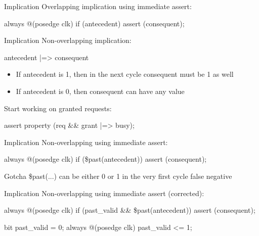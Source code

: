 \documentclass{beamer}
\begin{document}
\begin{frame}[fragile]{Implication}
Overlapping implication using immediate assert:

\begin{semiverbatim}
always @(posedge clk)
  if (antecedent)
    assert (consequent);
\end{semiverbatim}
\end{frame}


\begin{frame}{Implication}
Non-overlapping implication:

\begin{semiverbatim}
antecedent |=> consequent
\end{semiverbatim}

\begin{itemize}
 \item If antecedent is 1, then in the next cycle consequent must be 1 as well
 \item If antecedent is 0, then consequent can have any value
\end{itemize}

\pause
Start working on granted requests:
\begin{semiverbatim}
assert property (req \&\& grant |=> busy);
\end{semiverbatim}
\end{frame}


\begin{frame}[fragile]{Implication}
Non-overlapping using immediate assert:

\begin{semiverbatim}
always @(posedge clk)
  if (\$past(antecedent))
    assert (consequent);
\end{semiverbatim}

\pause
\begin{alertblock}{Gotcha}
\$past(...) can be either 0 or 1 in the very first cycle \textrightarrow{} false negative
\end{alertblock}
\end{frame}


\begin{frame}[fragile]{Implication}
Non-overlapping using immediate assert (corrected):

\begin{semiverbatim}
always @(posedge clk)
  if (past_valid \&\& \$past(antecedent))
    assert (consequent);
\end{semiverbatim}

\begin{semiverbatim}
bit past_valid = 0;
always @(posedge clk)
  past_valid <= 1;
\end{semiverbatim}
\end{frame}
\end{document}

